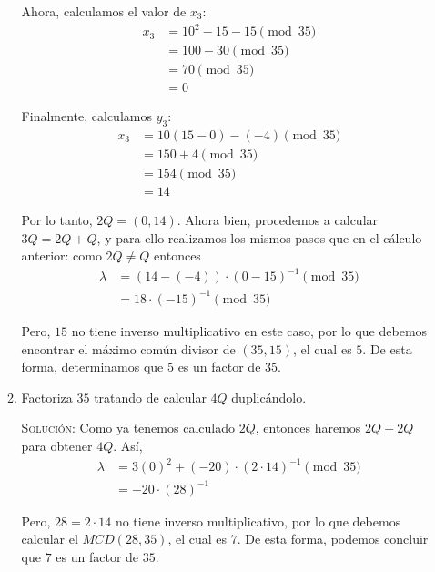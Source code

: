 \documentclass[letterpaper,11pt]{article}
\begin{document}
\begin{enumerate}
\begin{enumerate}
        Ahora, calculamos el valor de $x_3$:
        \begin{align*}
            x_3
            &= 10^2 - 15 - 15 \pmod{35} \\ 
            &= 100 - 30 \pmod{35} \\
            &= 70 \pmod{35} \\ 
            &= 0
        \end{align*}
        
        Finalmente, calculamos $y_3$:
        \begin{align*}
            x_3
            &= 10(15 - 0) - (-4) \pmod{35} \\ 
            &= 150 + 4 \pmod{35} \\
            &= 154 \pmod{35} \\ 
            &= 14
        \end{align*}
        
        Por lo tanto, $2Q = (0,14)$. Ahora bien, procedemos a calcular 
        $3Q = 2Q + Q$, y para ello realizamos los mismos pasos que en el 
        cálculo anterior: como $2Q \neq Q$ entonces 
        \begin{align*}
            \lambda 
            &= (14 - (-4)) \cdot (0 - 15)^{-1} \pmod{35} \\ 
            &= 18 \cdot (-15)^{-1} \pmod{35}
        \end{align*}

        Pero, $15$ no tiene inverso multiplicativo en este caso, por lo que 
        debemos encontrar el máximo común divisor de $(35, 15)$, el cual es 
        $5$. De esta forma, determinamos que $5$ es un factor de $35$.
    
        \item Factoriza $35$ tratando de calcular $4Q$ duplicándolo.

        \textsc{Solución:} Como ya tenemos calculado $2Q$, entonces haremos 
        $2Q + 2Q$ para obtener $4Q$. Así, 
        \begin{align*}
             \lambda 
             &= 3(0)^2 + (-20) \cdot (2 \cdot 14)^{-1} \pmod{35} \\
             &= -20 \cdot (28)^{-1}
        \end{align*}
        
        Pero, $28 = 2 \cdot 14$ no tiene inverso multiplicativo, por lo que 
        debemos calcular el $MCD(28,35)$, el cual es $7$. De esta forma, podemos 
        concluir que $7$ es un factor de $35$.


\end{enumerate}
\end{enumerate}
\end{document}
